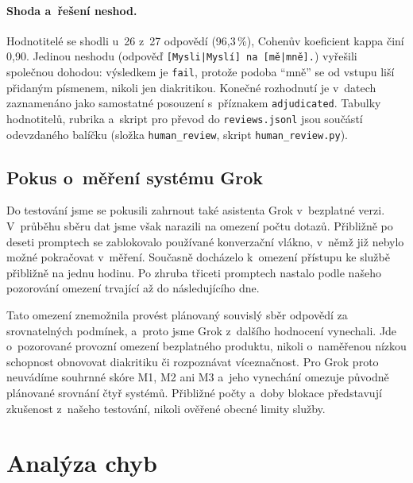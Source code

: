 \documentclass[11pt,a4paper]{article}
\begin{document}
\paragraph{Shoda a~řešení neshod.}
Hodnotitelé se shodli u~26 z~27 odpovědí (96{,}3\,\%), Cohenův
koeficient kappa \cite{cohen1960} činí 0{,}90. Jedinou neshodu
(odpověď \texttt{[Mysli|Myslí] na [mě|mně].}) vyřešili společnou
dohodou: výsledkem je \texttt{fail}, protože podoba \enquote{mně}
se od vstupu liší přidaným písmenem, nikoli jen diakritikou. Konečné
rozhodnutí je v~datech zaznamenáno jako samostatné posouzení
s~příznakem \texttt{adjudicated}. Tabulky hodnotitelů, rubrika a~skript
pro převod do \texttt{reviews.jsonl} jsou součástí odevzdaného balíčku
(složka \texttt{human\_review}, skript \texttt{human\_review.py}).

\subsection{Pokus o~měření systému Grok}
\label{sec:grok-omezeni}

Do testování jsme se pokusili zahrnout také asistenta Grok
v~bezplatné verzi.
V~průběhu sběru dat jsme však narazili na omezení počtu dotazů.
Přibližně po deseti promptech se zablokovalo používané konverzační
vlákno, v~němž již nebylo možné pokračovat v~měření. Současně
docházelo k~omezení přístupu ke službě přibližně na jednu hodinu.
Po zhruba třiceti promptech nastalo podle našeho pozorování
omezení trvající až do následujícího dne.

Tato omezení znemožnila provést plánovaný souvislý sběr odpovědí
za srovnatelných podmínek, a~proto jsme Grok z~dalšího hodnocení
vynechali. Jde o~pozorované provozní omezení bezplatného produktu,
nikoli o~naměřenou nízkou schopnost obnovovat diakritiku či
rozpoznávat víceznačnost. Pro Grok proto neuvádíme souhrnné skóre
M1, M2 ani M3 a~jeho vynechání omezuje původně plánované
srovnání čtyř systémů. Přibližné počty a~doby blokace představují
zkušenost z~našeho testování, nikoli ověřené obecné limity služby.



\section{Analýza chyb}
\label{sec:analyza-chyb}
\end{document}
